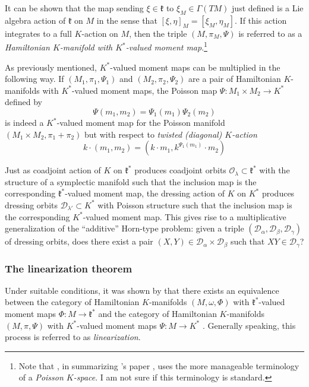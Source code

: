 \documentclass[notitlepage]{article}
\begin{document}
It can be shown that the map sending $\xi \in \mathfrak k$ to $\xi_M \in \Gamma(TM)$ just defined is a Lie algebra action of $\mathfrak k$ on $M$ in the sense that $[\xi,\eta]_M = [\xi_M, \eta_M]$.
If this action integrates to a full $K$-action on $M$, then the triple $(M, \pi_M, \Psi)$ is referred to as a \textit{Hamiltonian $K$-manifold with $K^{*}$-valued moment map}.\footnote{Note that \citeauthor{lamb2005proof} \cite{lamb2005proof}, in summarizing \citeauthor{alekseev2001linearization}'s paper \cite{lamb2005proof}, uses the more manageable terminology of a \textit{Poisson $K$-space}. I am not sure if this terminology is standard.}

As previously mentioned, $K^{*}$-valued moment maps can be multiplied in the following way.
If $(M_1, \pi_1, \Psi_1)$ and $(M_2, \pi_2, \Psi_2)$ are a pair of Hamiltonian $K$-manifolds with $K^{*}$-valued moment maps, the Poisson map $\Psi : M_1 \times M_2 \to K^{*}$ defined by
\begin{equation}
    \Psi(m_1,m_2) = \Psi_1(m_1)\Psi_2(m_2)
\end{equation}
is indeed a $K^{*}$-valued moment map for the Poisson manifold $(M_1 \times M_2, \pi_1 + \pi_2)$ but with respect to \textit{twisted (diagonal) $K$-action} 
\begin{equation}
    k \cdot (m_1, m_2) = (k \cdot m_1, k^{\Psi_1(m_1)} \cdot m_2)
\end{equation}

Just as coadjoint action of $K$ on $\mathfrak k^{*}$ produces coadjoint orbits $\mathcal O_{\lambda} \subset \mathfrak k^{*}$ with the structure of a symplectic manifold such that the inclusion map is the corresponding $\mathfrak k^{*}$-valued moment map, the dressing action of $K$ on $K^{*}$ produces dressing orbits $\mathcal D_{\lambda'} \subset K^{*}$ with Poisson structure such that the inclusion map is the corresponding $K^{*}$-valued moment map. 
This gives rise to a multiplicative generalization of the ``additive'' Horn-type problem: given a triple $(\mathcal D_{\alpha}, \mathcal D_{\beta}, \mathcal D_{\gamma})$ of dressing orbits, does there exist a pair $(X,Y) \in \mathcal D_{\alpha} \times \mathcal D_{\beta}$ such that $XY \in \mathcal D_{\gamma}$?

\subsubsection{The linearization theorem}

Under suitable conditions, it was shown by \cite{alekseev1997poisson} that there exists an equivalence between the category of Hamiltonian $K$-manifolds $(M, \omega, \Phi)$ with $\mathfrak k^{*}$-valued moment maps $\Phi : M \to \mathfrak k^{*}$ and the category of Hamiltonian $K$-manifolds $(M, \pi, \Psi)$ with $K^{*}$-valued moment maps $\Psi : M \to K^{*}$ \cite{alekseev1997poisson}.
Generally speaking, this process is referred to as \textit{linearization}.
\end{document}
